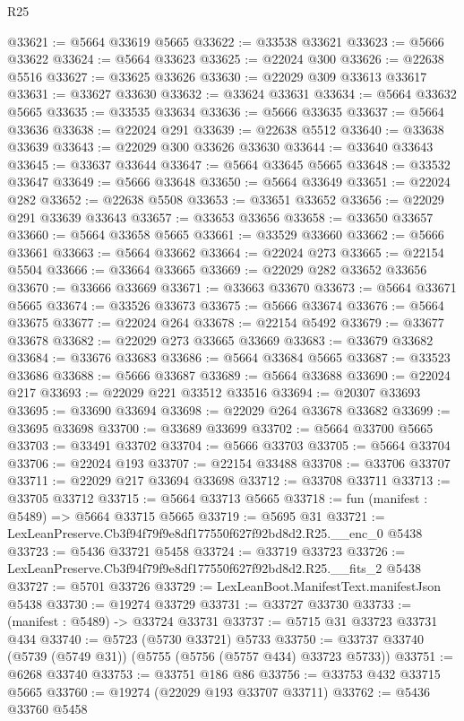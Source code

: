 \begin{lexlean}{R25}
\begin{coremodule}
@33621 := @5664 @33619 @5665
@33622 := @33538 @33621
@33623 := @5666 @33622
@33624 := @5664 @33623
@33625 := @22024 @300
@33626 := @22638 @5516
@33627 := @33625 @33626
@33630 := @22029 @309 @33613 @33617
@33631 := @33627 @33630
@33632 := @33624 @33631
@33634 := @5664 @33632 @5665
@33635 := @33535 @33634
@33636 := @5666 @33635
@33637 := @5664 @33636
@33638 := @22024 @291
@33639 := @22638 @5512
@33640 := @33638 @33639
@33643 := @22029 @300 @33626 @33630
@33644 := @33640 @33643
@33645 := @33637 @33644
@33647 := @5664 @33645 @5665
@33648 := @33532 @33647
@33649 := @5666 @33648
@33650 := @5664 @33649
@33651 := @22024 @282
@33652 := @22638 @5508
@33653 := @33651 @33652
@33656 := @22029 @291 @33639 @33643
@33657 := @33653 @33656
@33658 := @33650 @33657
@33660 := @5664 @33658 @5665
@33661 := @33529 @33660
@33662 := @5666 @33661
@33663 := @5664 @33662
@33664 := @22024 @273
@33665 := @22154 @5504
@33666 := @33664 @33665
@33669 := @22029 @282 @33652 @33656
@33670 := @33666 @33669
@33671 := @33663 @33670
@33673 := @5664 @33671 @5665
@33674 := @33526 @33673
@33675 := @5666 @33674
@33676 := @5664 @33675
@33677 := @22024 @264
@33678 := @22154 @5492
@33679 := @33677 @33678
@33682 := @22029 @273 @33665 @33669
@33683 := @33679 @33682
@33684 := @33676 @33683
@33686 := @5664 @33684 @5665
@33687 := @33523 @33686
@33688 := @5666 @33687
@33689 := @5664 @33688
@33690 := @22024 @217
@33693 := @22029 @221 @33512 @33516
@33694 := @20307 @33693
@33695 := @33690 @33694
@33698 := @22029 @264 @33678 @33682
@33699 := @33695 @33698
@33700 := @33689 @33699
@33702 := @5664 @33700 @5665
@33703 := @33491 @33702
@33704 := @5666 @33703
@33705 := @5664 @33704
@33706 := @22024 @193
@33707 := @22154 @33488
@33708 := @33706 @33707
@33711 := @22029 @217 @33694 @33698
@33712 := @33708 @33711
@33713 := @33705 @33712
@33715 := @5664 @33713 @5665
@33718 := fun (manifest : @5489) => @5664 @33715 @5665
@33719 := @5695 @31
@33721 := LexLeanPreserve.Cb3f94f79f9e8df177550f627f92bd8d2.R25.__enc_0 @5438
@33723 := @5436 @33721 @5458
@33724 := @33719 @33723
@33726 := LexLeanPreserve.Cb3f94f79f9e8df177550f627f92bd8d2.R25.__fits_2 @5438
@33727 := @5701 @33726
@33729 := LexLeanBoot.ManifestText.manifestJson @5438
@33730 := @19274 @33729
@33731 := @33727 @33730
@33733 := (manifest : @5489) -> @33724 @33731
@33737 := @5715 @31 @33723 @33731 @434
@33740 := @5723 (@5730 @33721) @5733
@33750 := @33737 @33740 (@5739 (@5749 @31)) (@5755 (@5756 (@5757 @434) @33723 @5733))
@33751 := @6268 @33740
@33753 := @33751 @186 @86
@33756 := @33753 @432 @33715 @5665
@33760 := @19274 (@22029 @193 @33707 @33711)
@33762 := @5436 @33760 @5458

\end{coremodule}
\end{lexlean}

